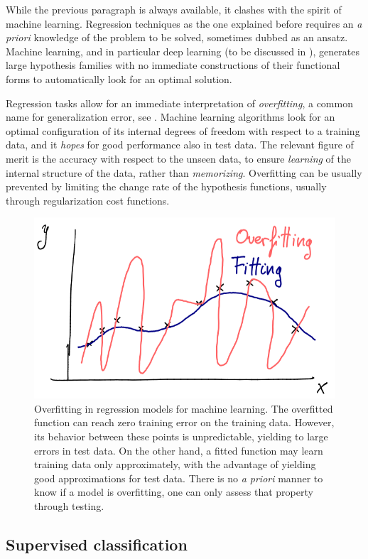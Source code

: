 \documentclass[]{report}
\begin{document}
While the previous paragraph is always available, it clashes with the spirit of machine learning. Regression techniques as the one explained before requires an \textit{a priori} knowledge of the problem to be solved, sometimes dubbed as an ansatz. Machine learning, and in particular deep learning (to be discussed in ), generates large hypothesis families with no immediate constructions of their functional forms to automatically look for an optimal solution. 

Regression tasks allow for an immediate interpretation of \textit{overfitting}, a common name for generalization error, see . Machine learning algorithms look for an optimal configuration of its internal degrees of freedom with respect to a training data, and it \textit{hopes} for good performance also in test data. The relevant figure of merit is the accuracy with respect to the unseen data, to ensure \textit{learning} of the internal structure of the data, rather than \textit{memorizing}. Overfitting can be usually prevented by limiting the change rate of the hypothesis functions, usually through regularization cost functions. 

\begin{figure}
\centering
\includegraphics[width = .5\linewidth]{images/overfitting}
\caption{Overfitting in regression models for machine learning. The overfitted function can reach zero training error on the training data. However, its behavior between these points is unpredictable, yielding to large errors in test data. On the other hand, a fitted function may learn training data only approximately, with the advantage of yielding good approximations for test data. There is no \textit{a priori} manner to know if a model is overfitting, one can only assess that property through testing.}
\end{figure}

\subsection{Supervised classification}\label{sec.classification}
\end{document}
